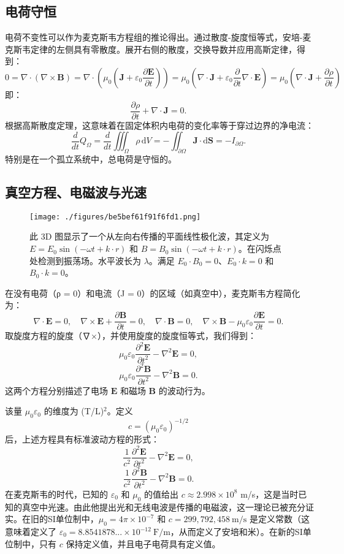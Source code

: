 \subsection{电荷守恒}
电荷不变性可以作为麦克斯韦方程组的推论得出。通过散度-旋度恒等式，安培-麦克斯韦定律的左侧具有零散度。展开右侧的散度，交换导数并应用高斯定律，得到：
\[ 0 = \nabla \cdot (\nabla \times \mathbf{B}) = \nabla \cdot \left(\mu_{0} \left(\mathbf{J} + \varepsilon_{0} \frac{\partial \mathbf{E}}{\partial t}\right)\right) = \mu_{0} \left(\nabla \cdot \mathbf{J} + \varepsilon_{0} \frac{\partial}{\partial t} \nabla \cdot \mathbf{E}\right) = \mu_{0} \left(\nabla \cdot \mathbf{J} + \frac{\partial \rho}{\partial t}\right)~\]
即：
\[
\frac{\partial \rho}{\partial t} + \nabla \cdot \mathbf{J} = 0.~
\]
根据高斯散度定理，这意味着在固定体积内电荷的变化率等于穿过边界的净电流：
\[
\frac{d}{dt} Q_{\Omega} = \frac{d}{dt} \iiint_{\Omega} \rho \, \mathrm{d} V = -\iint_{\partial \Omega} \mathbf{J} \cdot \mathrm{d} \mathbf{S} = -I_{\partial \Omega}.~
\]
特别是在一个孤立系统中，总电荷是守恒的。
\subsection{真空方程、电磁波与光速}  
\begin{figure}[ht]
\centering
\texttt{[image: ./figures/be5bef61f91f6fd1.png]}
\caption{此 3D 图显示了一个从左向右传播的平面线性极化波，其定义为 \(E = E_0 \sin(-\omega t + k \cdot r)\) 和 \(B = B_0 \sin(-\omega t + k \cdot r)\)。在闪烁点处检测到振荡场。水平波长为 \(\lambda\)。满足 \(E_0 \cdot B_0 = 0\)、\(E_0 \cdot k = 0\) 和 \(B_0 \cdot k = 0\)。} \label{fig_MAXS_9}
\end{figure}
在没有电荷（ρ = 0）和电流（J = 0）的区域（如真空中），麦克斯韦方程简化为：
\[
\nabla \cdot \mathbf{E} = 0, \quad \nabla \times \mathbf{E} + \frac{\partial \mathbf{B}}{\partial t} = 0, \quad \nabla \cdot \mathbf{B} = 0, \quad \nabla \times \mathbf{B} - \mu_0 \varepsilon_0 \frac{\partial \mathbf{E}}{\partial t} = 0.~
\]
取旋度方程的旋度（∇×），并使用旋度的旋度恒等式，我们得到：
\[
\mu_0 \varepsilon_0 \frac{\partial^2 \mathbf{E}}{\partial t^2} - \nabla^2 \mathbf{E} = 0,~
\]
\[
\mu_0 \varepsilon_0 \frac{\partial^2 \mathbf{B}}{\partial t^2} - \nabla^2 \mathbf{B} = 0.~
\]
这两个方程分别描述了电场 \(\mathbf{E}\) 和磁场 \(\mathbf{B}\) 的波动行为。

该量 \(\mu_0 \varepsilon_0\) 的维度为 (T/L)\(^2\)。定义
\[
c = (\mu_0 \varepsilon_0)^{-1/2}~
\]
后，上述方程具有标准波动方程的形式：
\[
\frac{1}{c^2} \frac{\partial^2 \mathbf{E}}{\partial t^2} - \nabla^2 \mathbf{E} = 0,~
\]
\[
\frac{1}{c^2} \frac{\partial^2 \mathbf{B}}{\partial t^2} - \nabla^2 \mathbf{B} = 0.~
\]
在麦克斯韦的时代，已知的 \(\varepsilon_0\) 和 \(\mu_0\) 的值给出 \(c \approx 2.998 \times 10^8\) m/s，这是当时已知的真空中光速。由此他提出光和无线电波是传播的电磁波，这一理论已被充分证实。在旧的SI单位制中，\(\mu_0 = 4\pi \times 10^{-7}\) 和 \(c = 299,792,458~\text{m/s}\) 是定义常数（这意味着定义了 \(\varepsilon_0 = 8.8541878... \times 10^{-12}~\text{F/m}\)，从而定义了安培和米）。在新的SI单位制中，只有 \(c\) 保持定义值，并且电子电荷具有定义值。

